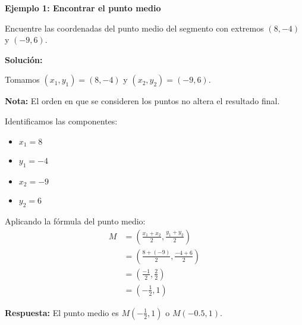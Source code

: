 \begin{example}
\textbf{Ejemplo 1: Encontrar el punto medio}

Encuentre las coordenadas del punto medio del segmento con extremos $(8, -4)$ y $(-9, 6)$.

\textbf{Solución:}

Tomamos $(x_1, y_1) = (8, -4)$ y $(x_2, y_2) = (-9, 6)$.

\textbf{Nota:} El orden en que se consideren los puntos no altera el resultado final.

Identificamos las componentes:
\begin{itemize}
    \item $x_1 = 8$
    \item $y_1 = -4$
    \item $x_2 = -9$
    \item $y_2 = 6$
\end{itemize}

Aplicando la fórmula del punto medio:
\begin{align*}
M &= \left(\frac{x_1 + x_2}{2}, \frac{y_1 + y_2}{2}\right) \\
  &= \left(\frac{8 + (-9)}{2}, \frac{-4 + 6}{2}\right) \\
  &= \left(\frac{-1}{2}, \frac{2}{2}\right) \\
  &= \left(-\frac{1}{2}, 1\right)
\end{align*}

\textbf{Respuesta:} El punto medio es $M\left(-\frac{1}{2}, 1\right)$ o $M(-0.5, 1)$.
\end{example}

\begin{center}
\end{center}

